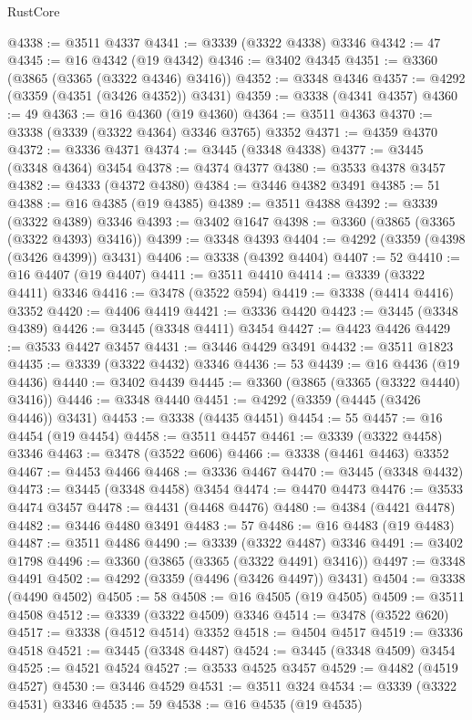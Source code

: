 \begin{lexlean}{RustCore}
\begin{coremodule}
@4338 := @3511 @4337
@4341 := @3339 (@3322 @4338) @3346
@4342 := 47
@4345 := @16 @4342 (@19 @4342)
@4346 := @3402 @4345
@4351 := @3360 (@3865 (@3365 (@3322 @4346) @3416))
@4352 := @3348 @4346
@4357 := @4292 (@3359 (@4351 (@3426 @4352)) @3431)
@4359 := @3338 (@4341 @4357)
@4360 := 49
@4363 := @16 @4360 (@19 @4360)
@4364 := @3511 @4363
@4370 := @3338 (@3339 (@3322 @4364) @3346 @3765) @3352
@4371 := @4359 @4370
@4372 := @3336 @4371
@4374 := @3445 (@3348 @4338)
@4377 := @3445 (@3348 @4364) @3454
@4378 := @4374 @4377
@4380 := @3533 @4378 @3457
@4382 := @4333 (@4372 @4380)
@4384 := @3446 @4382 @3491
@4385 := 51
@4388 := @16 @4385 (@19 @4385)
@4389 := @3511 @4388
@4392 := @3339 (@3322 @4389) @3346
@4393 := @3402 @1647
@4398 := @3360 (@3865 (@3365 (@3322 @4393) @3416))
@4399 := @3348 @4393
@4404 := @4292 (@3359 (@4398 (@3426 @4399)) @3431)
@4406 := @3338 (@4392 @4404)
@4407 := 52
@4410 := @16 @4407 (@19 @4407)
@4411 := @3511 @4410
@4414 := @3339 (@3322 @4411) @3346
@4416 := @3478 (@3522 @594)
@4419 := @3338 (@4414 @4416) @3352
@4420 := @4406 @4419
@4421 := @3336 @4420
@4423 := @3445 (@3348 @4389)
@4426 := @3445 (@3348 @4411) @3454
@4427 := @4423 @4426
@4429 := @3533 @4427 @3457
@4431 := @3446 @4429 @3491
@4432 := @3511 @1823
@4435 := @3339 (@3322 @4432) @3346
@4436 := 53
@4439 := @16 @4436 (@19 @4436)
@4440 := @3402 @4439
@4445 := @3360 (@3865 (@3365 (@3322 @4440) @3416))
@4446 := @3348 @4440
@4451 := @4292 (@3359 (@4445 (@3426 @4446)) @3431)
@4453 := @3338 (@4435 @4451)
@4454 := 55
@4457 := @16 @4454 (@19 @4454)
@4458 := @3511 @4457
@4461 := @3339 (@3322 @4458) @3346
@4463 := @3478 (@3522 @606)
@4466 := @3338 (@4461 @4463) @3352
@4467 := @4453 @4466
@4468 := @3336 @4467
@4470 := @3445 (@3348 @4432)
@4473 := @3445 (@3348 @4458) @3454
@4474 := @4470 @4473
@4476 := @3533 @4474 @3457
@4478 := @4431 (@4468 @4476)
@4480 := @4384 (@4421 @4478)
@4482 := @3446 @4480 @3491
@4483 := 57
@4486 := @16 @4483 (@19 @4483)
@4487 := @3511 @4486
@4490 := @3339 (@3322 @4487) @3346
@4491 := @3402 @1798
@4496 := @3360 (@3865 (@3365 (@3322 @4491) @3416))
@4497 := @3348 @4491
@4502 := @4292 (@3359 (@4496 (@3426 @4497)) @3431)
@4504 := @3338 (@4490 @4502)
@4505 := 58
@4508 := @16 @4505 (@19 @4505)
@4509 := @3511 @4508
@4512 := @3339 (@3322 @4509) @3346
@4514 := @3478 (@3522 @620)
@4517 := @3338 (@4512 @4514) @3352
@4518 := @4504 @4517
@4519 := @3336 @4518
@4521 := @3445 (@3348 @4487)
@4524 := @3445 (@3348 @4509) @3454
@4525 := @4521 @4524
@4527 := @3533 @4525 @3457
@4529 := @4482 (@4519 @4527)
@4530 := @3446 @4529
@4531 := @3511 @324
@4534 := @3339 (@3322 @4531) @3346
@4535 := 59
@4538 := @16 @4535 (@19 @4535)

\end{coremodule}
\end{lexlean}
